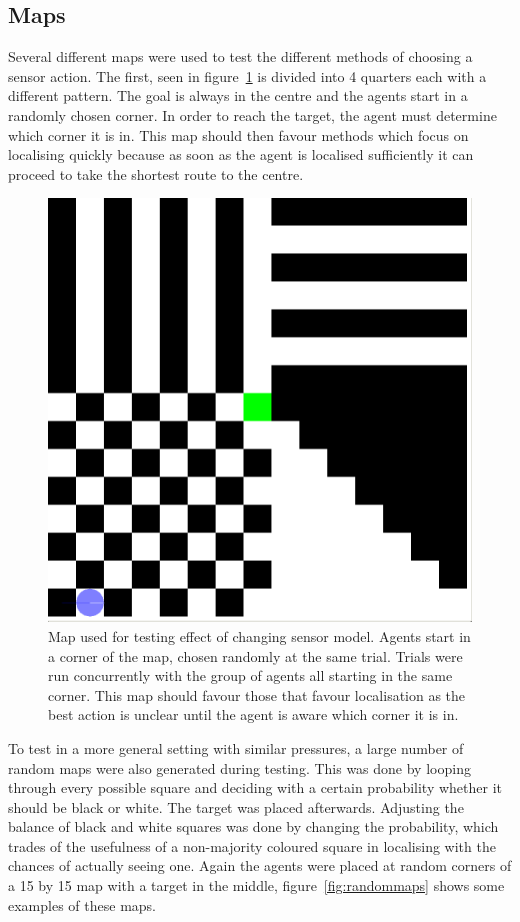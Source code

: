 \documentclass{article}
\begin{document}
\subsection{Maps}
Several different maps were used to test the different methods of choosing a sensor 
action. The first, seen in figure~\ref{fig:quarter} is divided into 4 quarters each
with a different pattern. The goal is always in the centre and the agents start in 
a randomly chosen corner. In order to reach the target, the agent must determine
which corner it is in. This map should then favour methods which focus on localising
quickly because as soon as the agent is localised sufficiently it can proceed to
take the shortest route to the centre.
\begin{figure}
\centering
\includegraphics[width=\linewidth]{./figures/quartermap.png}
\caption{Map used for testing effect of changing sensor model. Agents start in 
a corner of the map, chosen randomly at the same trial. Trials were run concurrently 
with the group of agents all starting in the same corner. This map should favour those
that favour localisation as the best action is unclear until the agent is aware which 
corner it is in.}
\label{fig:quarter}
\end{figure}

To test in a more general setting with similar pressures, a large number of random maps
were also generated during testing. This was done by looping through every possible
square and deciding with a certain probability whether it should be black or white.
 The target was placed
afterwards. Adjusting the balance of black and white squares was done by changing the 
probability, which trades of the usefulness of a non-majority coloured square in 
localising with the chances of actually seeing one. 
Again the agents were placed at random corners
of a 15 by 15 map with a target in the middle, figure~\ref{fig:randommaps} shows 
some examples of these maps.
\end{document}
